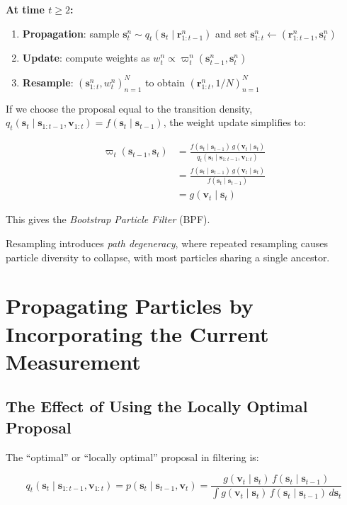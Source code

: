 \documentclass[11pt,a4paper]{article}
\begin{document}
\textbf{At time $t \geq 2$:}
\begin{enumerate}
\item \textbf{Propagation}: sample $\mathbf{s}_t^n \sim q_t(\mathbf{s}_t \mid \mathbf{r}_{1:t-1}^n)$ and set $\mathbf{s}_{1:t}^n \leftarrow (\mathbf{r}_{1:t-1}^n, \mathbf{s}_t^n)$
\item \textbf{Update}: compute weights as $w_t^n \propto \varpi_t^n(\mathbf{s}_{t-1}^n, \mathbf{s}_t^n)$
\item \textbf{Resample}: $(\mathbf{s}_{1:t}^n, w_t^n)_{n=1}^N$ to obtain $(\mathbf{r}_{1:t}^n, 1/N)_{n=1}^N$
\end{enumerate}

If we choose the proposal equal to the transition density, $q_t(\mathbf{s}_t \mid \mathbf{s}_{1:t-1}, \mathbf{v}_{1:t}) = f(\mathbf{s}_t \mid \mathbf{s}_{t-1})$, the weight update simplifies to:

\begin{align}
\varpi_t(\mathbf{s}_{t-1}, \mathbf{s}_t) &= \frac{f(\mathbf{s}_t \mid \mathbf{s}_{t-1}) \, g(\mathbf{v}_t \mid \mathbf{s}_t)}{q_t(\mathbf{s}_t \mid \mathbf{s}_{1:t-1}, \mathbf{v}_{1:t})} \nonumber \\
&= \frac{f(\mathbf{s}_t \mid \mathbf{s}_{t-1}) \, g(\mathbf{v}_t \mid \mathbf{s}_t)}{f(\mathbf{s}_t \mid \mathbf{s}_{t-1})} \nonumber \\
&= g(\mathbf{v}_t \mid \mathbf{s}_t)
\label{eq:bpf_weights}
\end{align}

This gives the \textit{Bootstrap Particle Filter} (BPF).

Resampling introduces \textit{path degeneracy}, where repeated resampling causes particle diversity to collapse, with most particles sharing a single ancestor.

\section{Propagating Particles by Incorporating the Current Measurement}

\subsection{The Effect of Using the Locally Optimal Proposal}

The ``optimal'' or ``locally optimal'' proposal in filtering is:

\begin{equation}
q_t(\mathbf{s}_t \mid \mathbf{s}_{1:t-1}, \mathbf{v}_{1:t}) = p(\mathbf{s}_t \mid \mathbf{s}_{t-1}, \mathbf{v}_t) = \frac{g(\mathbf{v}_t \mid \mathbf{s}_t) \, f(\mathbf{s}_t \mid \mathbf{s}_{t-1})}{\int g(\mathbf{v}_t \mid \mathbf{s}_t) \, f(\mathbf{s}_t \mid \mathbf{s}_{t-1}) \, d\mathbf{s}_t}
\end{equation}
\end{document}
